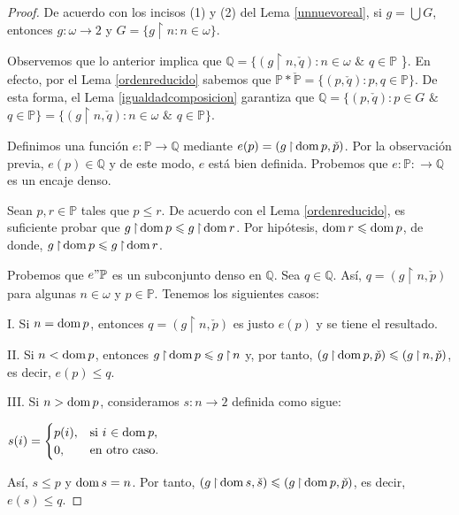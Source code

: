 \documentclass[11pt]{unam_tesis1}
\theoremstyle{MyThmStyle}
\theoremstyle{definition}
\theoremstyle{plain}
\theoremstyle{remark}
\def\dom{\mathop{\rm dom}\nolimits}
\def\rest{\mathop{\upharpoonright}\nolimits}
\let\leq\leqslant
\begin{document}
\begin{proof}
De acuerdo con los incisos (1) y (2) del Lema \ref{unnuevoreal}, si $g=\bigcup G$, entonces $g:\omega\to 2$ y $G =\{g\rest n : n \in \omega \}$.

Observemos que lo anterior implica que $\mathbb Q=\{(g\rest n,\check q): n\in \omega$ $\&$  $q\in \mathbb P$ \}. En efecto, por el Lema \ref{ordenreducido} sabemos que  $\mathbb P*\check{\mathbb P} = \{ (p,\check q) : p, q \in \mathbb P\}$. De esta forma, el Lema \ref{igualdadcomposicion} garantiza que $\mathbb Q =\{(p, \check{q}):p\in G$ $\&$ $q\in \mathbb P \}= \{ (g\rest n,\check q) : n \in \omega$ $\&$ $q \in \mathbb P \}$.

Definimos una funci\'on $e:\mathbb P\to \mathbb Q$ mediante $e(p)=(g\rest \dom p, \check{p})$. Por la observaci\'on previa, $e(p)\in \mathbb Q$ y de este modo, $e$ est\'a bien definida. Probemos que $e:\mathbb P:\to \mathbb Q$ es un encaje denso.

Sean $p,r\in \mathbb P$ tales que $p\leq r$. De acuerdo con el Lema \ref{ordenreducido}, es suficiente probar que $g\rest \dom p\leq g\rest \dom r$. Por hip\'otesis, $\dom r\leq \dom p$, de donde, $g\rest \dom p\leq g\rest \dom r$.

Probemos que $e"\mathbb P$ es un subconjunto denso en $\mathbb Q$. Sea $q\in \mathbb Q$. As\'i, $q=(g\rest n,\check{p})$ para algunas $n\in \omega$ y $p\in \mathbb{P}$. Tenemos los siguientes casos:

I. Si $n=\dom p$, entonces $q=(g\rest n, \check{p})$ es justo $e(p)$ y se tiene el resultado.

II. Si $n<\dom p$, entonces $g\rest \dom p\leq g\rest n$ y, por tanto, $(g\rest \dom p, \check p)\leq (g\rest n,\check p)$, es decir, $e(p)\leq q$.

III. Si $n>\dom p$, consideramos $s:n\to 2$ definida como sigue:

\begin{center}
$s(i) = \begin{cases} p(i), & \mbox{si } i\mbox{  $\in \dom p$}, \\ 0, & \mbox{en otro caso.} \end{cases}$
\end{center}

As\'i, $s\leq p$ y $\dom s=n$. Por tanto, $(g\rest \dom s,\check{s})\leq (g\rest \dom p,\check{p})$, es decir, $e(s)\leq q$.
\end{proof}

\end{document}
